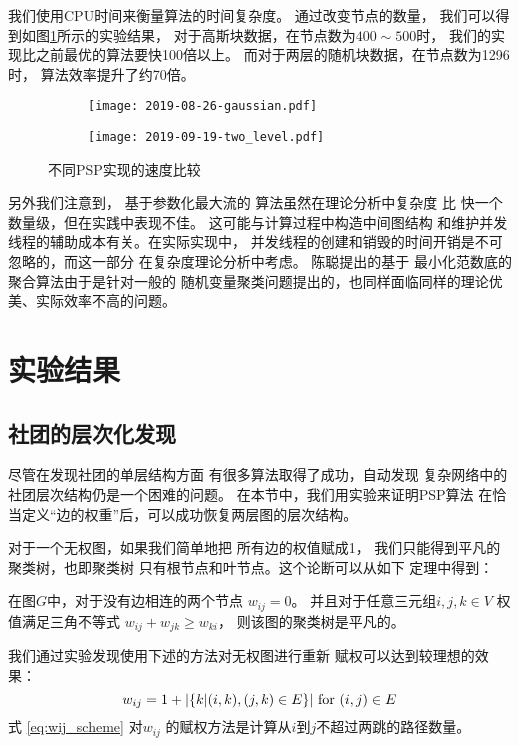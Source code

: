 我们使用CPU时间来衡量算法的时间复杂度。
通过改变节点的数量，
我们可以得到如图\ref{fig:esc}所示的实验结果，
对于高斯块数据，在节点数为$400\sim 500$时，
我们的实现比之前最优的算法要快100倍以上。
而对于两层的随机块数据，在节点数为1296时，
算法效率提升了约70倍。
\begin{figure}
	\centering
	\begin{subfigure}{0.45\textwidth}
		\texttt{[image: 2019-08-26-gaussian.pdf]}
	\end{subfigure}
	\begin{subfigure}{0.45\textwidth}
		\texttt{[image: 2019-09-19-two\_level.pdf]}
	\end{subfigure}
	\caption{
  不同PSP实现的速度比较}\label{fig:esc}
\end{figure}

另外我们注意到，
基于参数化最大流的
算法\citep{kolmogorov}虽然在理论分析中复杂度
比 \cite{narayanan} 快一个数量级，但在实践中表现不佳。
这可能与计算过程中构造中间图结构
和维护并发线程的辅助成本有关。在实际实现中，
并发线程的创建和销毁的时间开销是不可忽略的，而这一部分
在复杂度理论分析中考虑。
陈聪提出的基于 最小化范数底的聚合算法由于是针对一般的
随机变量聚类问题提出的，也同样面临同样的理论优美、实际效率不高的问题\cite{chan2020agglomerative}。

\section{实验结果}
\subsection{社团的层次化发现}
\label{subsec:cd}
尽管在发现社团的单层结构方面
有很多算法取得了成功，自动发现
复杂网络中的社团层次结构仍是一个困难的问题。
在本节中，我们用实验来证明PSP算法
在恰当定义“边的权重”后，可以成功恢复两层图的层次结构。

对于一个无权图，如果我们简单地把
所有边的权值赋成1，
我们只能得到平凡的聚类树，也即聚类树
只有根节点和叶节点。这个论断可以从如下
定理中得到：
\begin{theorem}\label{thm:triangle}
  在图$G$中，对于没有边相连的两个节点 $w_{ij}=0$。
  并且对于任意三元组$i,j,k \in V$ 权值满足三角不等式 
  $w_{ij} + w_{jk} \geq w_{ki}$，
  则该图的聚类树是平凡的。
\end{theorem}
  
我们通过实验发现使用下述的方法对无权图进行重新
赋权可以达到较理想的效果：
\begin{equation}\label{eq:wij_scheme}
    w_{ij} = 1 + \lvert\{k | (i,k),(j,k) \in E \}\rvert \textrm{ for } (i,j) \in E
\end{equation}
式 \eqref{eq:wij_scheme} 对$w_{ij}$
的赋权方法是计算从$i$到$j$不超过两跳的路径数量。

